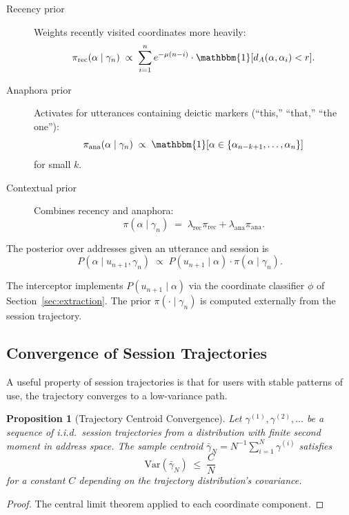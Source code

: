 \documentclass[11pt,a4paper]{article}
\newtheorem{proposition}[theorem]{Proposition}
\theoremstyle{definition}
\theoremstyle{remark}
\begin{document}
\begin{description}
    \item[Recency prior] Weights recently visited coordinates more heavily:
    \[
    \pi_{\mathrm{rec}}(\alpha \mid \gamma_n) \;\propto\; \sum_{i=1}^{n} e^{-\mu(n-i)} \cdot \mathbbm{1}[d_A(\alpha, \alpha_i) < r].
    \]

    \item[Anaphora prior] Activates for utterances containing deictic markers (``this,'' ``that,'' ``the one''):
    \[
    \pi_{\mathrm{ana}}(\alpha \mid \gamma_n) \;\propto\; \mathbbm{1}[\alpha \in \{\alpha_{n-k+1}, \ldots, \alpha_n\}]
    \]
    for small $k$.

    \item[Contextual prior] Combines recency and anaphora:
    \[
    \pi(\alpha \mid \gamma_n) \;=\; \lambda_{\mathrm{rec}} \pi_{\mathrm{rec}} + \lambda_{\mathrm{ana}} \pi_{\mathrm{ana}}.
    \]
\end{description}

The posterior over addresses given an utterance and session is
\[
P(\alpha \mid u_{n+1}, \gamma_n) \;\propto\; P(u_{n+1} \mid \alpha) \cdot \pi(\alpha \mid \gamma_n).
\]

The interceptor implements $P(u_{n+1} \mid \alpha)$ via the coordinate classifier $\phi$ of Section~\ref{sec:extraction}. The prior $\pi(\cdot \mid \gamma_n)$ is computed externally from the session trajectory.

\subsection{Convergence of Session Trajectories}

A useful property of session trajectories is that for users with stable patterns of use, the trajectory converges to a low-variance path.

\begin{proposition}[Trajectory Centroid Convergence]
\label{prop:centroid}
Let $\gamma^{(1)}, \gamma^{(2)}, \ldots$ be a sequence of i.i.d.\ session trajectories from a distribution with finite second moment in address space. The sample centroid $\bar\gamma_N = N^{-1} \sum_{i=1}^N \gamma^{(i)}$ satisfies
\[
\mathrm{Var}(\bar\gamma_N) \;\leq\; \frac{C}{N}
\]
for a constant $C$ depending on the trajectory distribution's covariance.
\end{proposition}

\begin{proof}
The central limit theorem applied to each coordinate component.
\end{proof}
\end{document}
